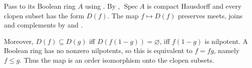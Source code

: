 Pass to its Boolean ring $A$ using . By , $\operatorname{Spec}A$ is compact Hausdorff and every clopen subset has the form $D(f)$. The map $f\mapsto D(f)$ preserves meets, joins and complements by  and .

Moreover, $D(f)\subseteq D(g)$ iff $D(f(1-g))=\varnothing$, iff $f(1-g)$ is nilpotent. A Boolean ring has no nonzero nilpotents, so this is equivalent to $f=fg$, namely $f\leq g$. Thus the map is an order isomorphism onto the clopen subsets.
